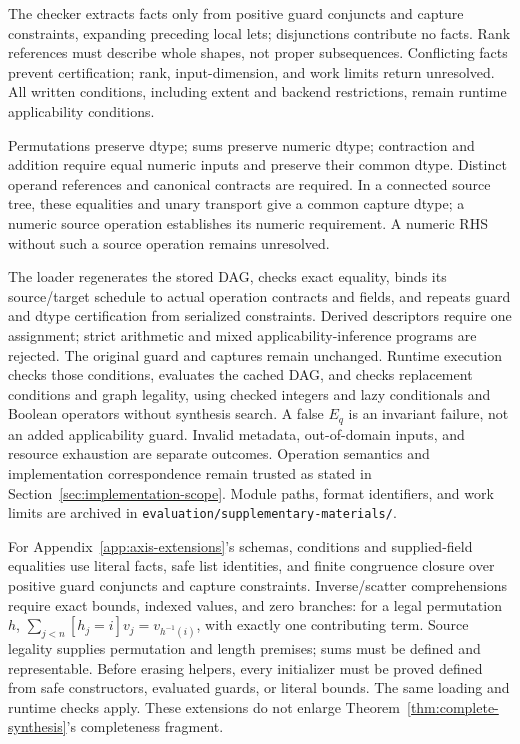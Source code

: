 The checker extracts facts only from positive guard conjuncts and capture
constraints, expanding preceding local lets; disjunctions contribute no
facts. Rank references must describe whole shapes, not proper subsequences.
Conflicting facts prevent certification; rank, input-dimension, and work
limits return unresolved. All written conditions, including extent and
backend restrictions, remain runtime applicability conditions.

Permutations preserve dtype; sums preserve numeric dtype; contraction and
addition require equal numeric inputs and preserve their common dtype.
Distinct operand references and canonical contracts are required.
In a connected source tree, these equalities and unary transport give a
common capture dtype; a numeric source operation establishes its numeric
requirement. A numeric RHS without such a source operation remains unresolved.

The loader regenerates the stored DAG, checks exact equality, binds its
source/target schedule to actual operation contracts and fields, and repeats
guard and dtype certification from serialized constraints. Derived descriptors
require one assignment; strict arithmetic and mixed applicability-inference
programs are rejected. The original guard and captures remain unchanged.
Runtime execution checks those conditions, evaluates the cached DAG, and
checks replacement conditions and graph legality, using checked integers
and lazy conditionals and Boolean operators without synthesis search.
A false $E_q$ is an invariant failure, not an added applicability guard.
Invalid metadata, out-of-domain inputs, and resource exhaustion are separate
outcomes. Operation semantics and implementation correspondence remain
trusted as stated in Section~\ref{sec:implementation-scope}.
Module paths, format identifiers, and work limits are archived in
\nolinkurl{evaluation/supplementary-materials/}.

\label{app:extension-schema-implementation}
For Appendix~\ref{app:axis-extensions}'s schemas, conditions and supplied-field
equalities use literal facts, safe list identities, and finite congruence
closure over positive guard conjuncts and capture constraints.
Inverse/scatter comprehensions require exact bounds, indexed values, and
zero branches: for a legal permutation $h$,
$\sum_{j<n}[h_j=i]v_j=v_{h^{-1}(i)}$, with exactly one contributing term.
Source legality supplies permutation and length premises; sums must be
defined and representable. Before erasing helpers, every initializer must
be proved defined from safe constructors, evaluated guards, or literal
bounds. The same loading and runtime checks apply. These extensions do not
enlarge Theorem~\ref{thm:complete-synthesis}'s completeness fragment.

